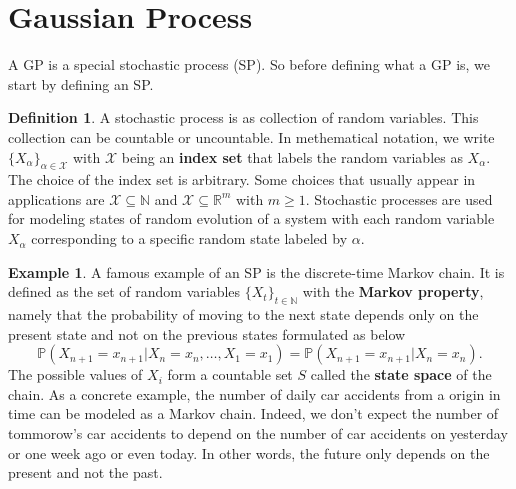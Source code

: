 \documentclass[10pt]{article}
\theoremstyle{definition}
\newtheorem{defn}{Definition}[section]
\theoremstyle{definition}
\newtheorem{exmp}{Example}[section]
\theoremstyle{remark}
\begin{document}
\section{Gaussian Process}
 A GP is a special stochastic process (SP). So before defining what a GP is, we start by defining an SP.
 \begin{defn}
 A stochastic process is as collection of random variables. This collection can be countable or uncountable. In methematical notation, we write $\{X_{\alpha}\}_{\alpha\in \mathcal{X}}$ with $\mathcal{X}$ being an \textbf{index set} that labels the random variables as $X_{\alpha}$. The choice of the index set is arbitrary. Some choices that usually appear in applications are $\mathcal{X}\subseteq\mathbb{N}$ and $\mathcal{X}\subseteq\mathbb{R}^{m}$ with $m \ge 1$. Stochastic processes are used for modeling states of random evolution of a system with each random variable $X_{\alpha}$ corresponding to a specific random state labeled by $\alpha$.
 \end{defn}
 \begin{exmp}
 A famous example of an SP is the discrete-time Markov chain. It is defined as the set of random variables $\{X_t\}_{t\in\mathbb{N}}$ with the \textbf{Markov property}, namely that the probability of moving to the next state depends only on the present state and not on the previous states formulated as below
 \begin{equation*}
 \mathbb{P}(X_{n+1} = x_{n+1} | X_{n} = x_{n},\dots,X_{1} = x_{1}) =  \mathbb{P}(X_{n+1} = x_{n+1}|X_{n} = x_{n}).
 \end{equation*}
 The possible values of $X_i$ form a countable set $S$ called the \textbf{state space} of the chain. As a concrete example, the number of daily car accidents from a origin in time can be modeled as a Markov chain. Indeed, we don't expect the number of tommorow's car accidents to depend on the number of car accidents on yesterday or one week ago or even today. In other words, the future only depends on the present and not the past.
 \end{exmp}
 
\end{document}
